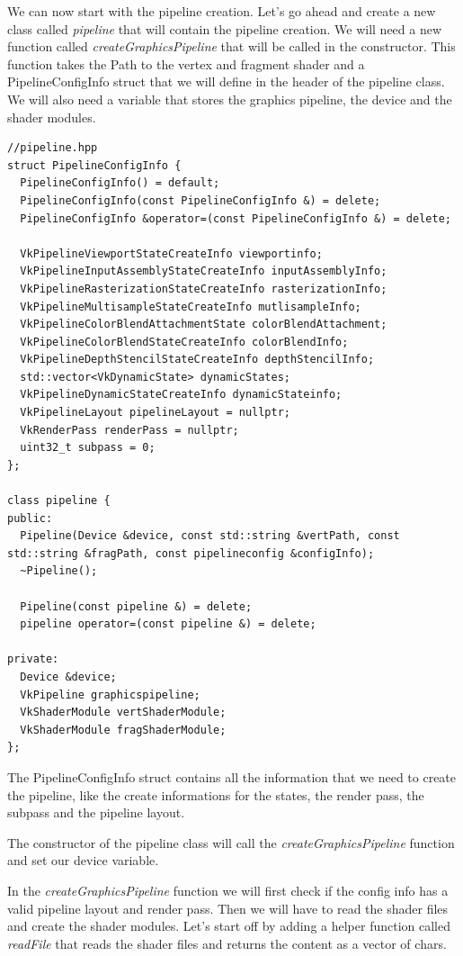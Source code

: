 \documentclass[12pt]{report} \usepackage{preamble}
\begin{document}
We can now start with the pipeline creation. Let's go ahead and create a new class called \textit{pipeline} that will
contain the pipeline creation. We will need a new function called \textit{createGraphicsPipeline} that will be called
in the constructor. This function takes the Path to the vertex and fragment shader and a PipelineConfigInfo struct that
we will define in the header of the pipeline class. We will also need a variable that stores the graphics pipeline, the
device and the shader modules.

\begin{lstlisting}[Language=C++]
//pipeline.hpp
struct PipelineConfigInfo {
  PipelineConfigInfo() = default;
  PipelineConfigInfo(const PipelineConfigInfo &) = delete;
  PipelineConfigInfo &operator=(const PipelineConfigInfo &) = delete;

  VkPipelineViewportStateCreateInfo viewportinfo;
  VkPipelineInputAssemblyStateCreateInfo inputAssemblyInfo;
  VkPipelineRasterizationStateCreateInfo rasterizationInfo;
  VkPipelineMultisampleStateCreateInfo mutlisampleInfo;
  VkPipelineColorBlendAttachmentState colorBlendAttachment;
  VkPipelineColorBlendStateCreateInfo colorBlendInfo;
  VkPipelineDepthStencilStateCreateInfo depthStencilInfo;
  std::vector<VkDynamicState> dynamicStates;
  VkPipelineDynamicStateCreateInfo dynamicStateinfo;
  VkPipelineLayout pipelineLayout = nullptr;
  VkRenderPass renderPass = nullptr;
  uint32_t subpass = 0;
};

class pipeline {
public:
  Pipeline(Device &device, const std::string &vertPath, const std::string &fragPath, const pipelineconfig &configInfo);
  ~Pipeline();

  Pipeline(const pipeline &) = delete;
  pipeline operator=(const pipeline &) = delete;

private:
  Device &device;
  VkPipeline graphicspipeline;
  VkShaderModule vertShaderModule;
  VkShaderModule fragShaderModule;
};
\end{lstlisting}

The PipelineConfigInfo struct contains all the information that we need to create the pipeline, like the create informations
for the states, the render pass, the subpass and the pipeline layout.

The constructor of the pipeline class will call the \textit{createGraphicsPipeline} function and set our device variable.

In the \textit{createGraphicsPipeline} function we will first check if the config info has a valid pipeline layout and render pass.
Then we will have to read the shader files and create the shader modules. Let's start off by adding a helper function called
\textit{readFile} that reads the shader files and returns the content as a vector of chars.
\end{document}
